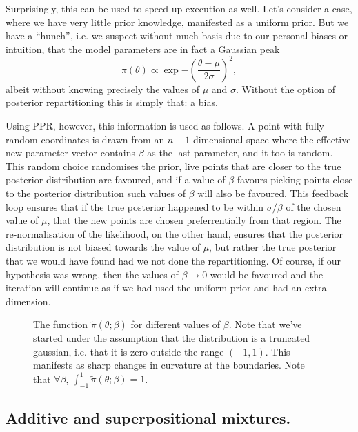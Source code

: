 \documentclass[usenatbib]{mnras}
\begin{document}
Surprisingly, this can be used to speed up execution as well. Let's
consider a case, where we have very little prior knowledge,
manifested as a uniform prior. But we have a ``hunch'', i.e. we
suspect without much basis due to our personal biases or intuition,
that the model parameters are in fact a Gaussian peak
\begin{equation}
 \pi (\theta) \propto \exp{ -\left(\frac{\theta - \mu}{2\sigma}\right)^{2}},
\end{equation}
albeit without knowing precisely the values of \(\mu\) and
\(\sigma\). Without the option of posterior repartitioning this is
simply that: a bias. 

Using PPR, however, this information is used as follows. A point
with fully random coordinates is drawn from an \(n+1\) dimensional
space where the effective new parameter vector contains \(\beta\)
as the last parameter, and it too is random. This random choice
randomises the prior, live points that are closer to the true
posterior distribution are favoured, and if a value of \(\beta\)
favours picking points close to the posterior distribution such
values of \(\beta\) will also be favoured. This feedback loop
ensures that if the true posterior happened to be within \(\sigma /
   \beta\) of the chosen value of \(\mu\), that the new points are
chosen preferrentially from that region. The re-normalisation of
the likelihood, on the other hand, ensures that the posterior
distribution is not biased towards the value of \(\mu\), but rather
the true posterior that we would have found had we not done the
repartitioning. Of course, if our hypothesis was wrong, then the
values of \(\beta \rightarrow 0\) would be favoured and the
iteration will continue as if we had used the uniform prior and had
an extra dimension.

\begin{figure}
 
\caption{\label{org8a74bfc}
The function \(\tilde{\pi}(\theta; \beta)\) for different values of \(\beta\). Note that we've started under the assumption that the distribution is a truncated gaussian, i.e. that it is zero outside the range \((-1, 1)\). This manifests as sharp changes in curvature at the boundaries. Note that \(\forall \beta\), \(\int_{-1}^{1}\tilde{\pi}(\theta; \beta) = 1\).}
\end{figure}

\subsection{Additive and superpositional mixtures.}
\label{sec:org08af3c6}
\end{document}
